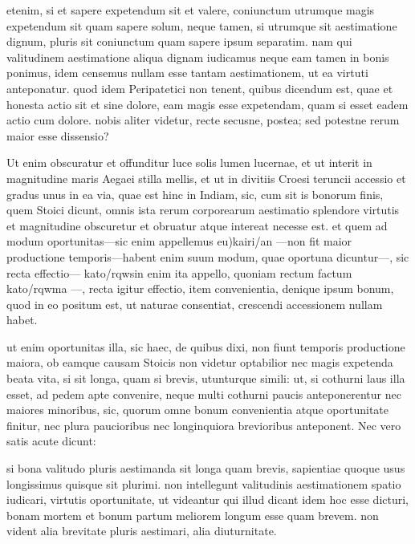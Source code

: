  etenim, si et sapere expetendum sit et valere, coniunctum utrumque magis expetendum sit quam sapere solum, neque tamen, si utrumque sit aestimatione dignum, pluris sit coniunctum quam sapere ipsum separatim. nam qui valitudinem aestimatione aliqua dignam iudicamus neque eam tamen in bonis ponimus, idem censemus nullam esse tantam aestimationem, ut ea virtuti anteponatur. quod idem Peripatetici non tenent, quibus dicendum est, quae et honesta actio sit et sine dolore, eam magis esse expetendam, quam si esset eadem actio cum dolore. nobis aliter videtur, recte secusne, postea; sed potestne rerum maior esse dissensio?

 Ut enim obscuratur et offunditur luce solis lumen lucernae, et ut interit in magnitudine maris Aegaei stilla mellis, et ut in divitiis Croesi teruncii accessio et gradus unus in ea via, quae est hinc in Indiam, sic, cum sit is bonorum finis, quem Stoici dicunt, omnis ista rerum corporearum aestimatio splendore virtutis et magnitudine obscuretur et obruatur atque intereat necesse est. et quem ad modum oportunitas—sic enim appellemus eu)kairi/an —non fit maior productione temporis—habent enim suum modum, quae oportuna dicuntur—, sic recta effectio— kato/rqwsin enim ita appello, quoniam rectum factum kato/rqwma —, recta igitur effectio, item convenientia, denique ipsum bonum, quod in eo positum est, ut naturae consentiat, crescendi accessionem nullam habet.

 ut enim oportunitas illa, sic haec, de quibus dixi, non fiunt temporis productione maiora, ob eamque causam Stoicis non videtur optabilior nec magis expetenda beata vita, si sit longa, quam si brevis, utunturque simili: ut, si cothurni laus illa esset, ad pedem apte convenire, neque multi cothurni paucis anteponerentur nec maiores minoribus, sic, quorum omne bonum convenientia atque oportunitate finitur, nec plura paucioribus nec longinquiora brevioribus anteponent. Nec vero satis acute dicunt:

 si bona valitudo pluris aestimanda sit longa quam brevis, sapientiae quoque usus longissimus quisque sit plurimi. non intellegunt valitudinis aestimationem spatio iudicari, virtutis oportunitate, ut videantur qui illud dicant idem hoc esse dicturi, bonam mortem et bonum partum meliorem longum esse quam brevem. non vident alia brevitate pluris aestimari, alia diuturnitate.

